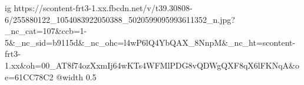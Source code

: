  
 
 
 
 

\ifcmt
  ig https://scontent-frt3-1.xx.fbcdn.net/v/t39.30808-6/255880122_1054083922050388_5020599095993611352_n.jpg?_nc_cat=107&ccb=1-5&_nc_sid=b9115d&_nc_ohc=l4wP6lQ4YbQAX_8NnpM&_nc_ht=scontent-frt3-1.xx&oh=00_AT8f74ozXxmIj64wKTs4WFMlPDG8vQDWgQXF8qX6lFKNqA&oe=61CC78C2
  @width 0.5
\fi

